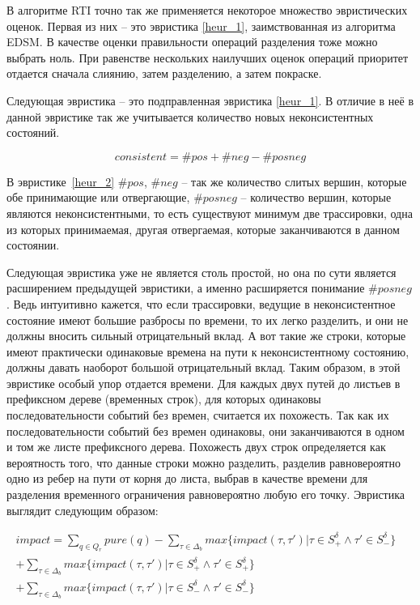 \documentclass[times,specification,annotation]{itmo-student-thesis}
\begin{document}
В алгоритме RTI точно так же применяется некоторое множество эвристических оценок. Первая из них -- это эвристика \ref{heur_1}, заимствованная из алгоритма EDSM. 
В качестве оценки правильности операций разделения тоже можно выбрать ноль. При равенстве нескольких наилучших оценок операций приоритет отдается сначала слиянию, затем разделению, а затем покраске.

Следующая эвристика -- это подправленная эвристика \ref{heur_1}. В отличие в неё в данной эвристике так же учитывается количество новых неконсистентных состояний.

\begin{equation}
  consistent = \#pos + \#neg - \#posneg
  \label{heur_2}
\end{equation}

В эвристике~\ref{heur_2} $\#pos$, $\#neg$ -- так же количество слитых вершин, которые обе принимающие или отвергающие, $\#posneg$ -- количество вершин, которые являются неконсистентными, то есть
существуют минимум две трассировки, одна из которых принимаемая, другая отвергаемая, которые заканчиваются в данном состоянии.

Следующая эвристика уже не является столь простой, но она по сути является расширением предыдущей эвристики, а именно расширяется понимание $\#posneg$. Ведь интуитивно кажется, что
если трассировки, ведущие в неконсистентное состояние имеют большие разбросы по времени, то их легко разделить, и они не должны вносить сильный отрицательный вклад. А вот такие же строки,
которые имеют практически одинаковые времена на пути к неконсистентному состоянию, должны давать наоборот большой отрицательный вклад.
Таким образом, в этой эвристике особый упор отдается времени. Для каждых двух путей до листьев в префиксном дереве (временных строк), 
для которых одинаковы последовательности событий без времен, считается их похожесть. Так как их последовательности событий без времен одинаковы, они заканчиваются в одном и том же листе 
префиксного дерева. Похожесть двух строк определяется как вероятность того, что данные строки можно разделить, разделив равновероятно одно из ребер на пути от корня до листа, выбрав в качестве
времени для разделения временного ограничения равновероятно любую его точку. Эвристика выглядит следующим образом:

\begin{equation}
  \begin{split}
    impact = \mathop{\sum}\limits_{q \in Q_r}pure(q) - \mathop{\sum}\limits_{\tau \in \Delta_b}max\{impact(\tau, \tau') | \tau \in S^\delta_+ \land \tau' \in S^\delta_-\}& \\
						     + \mathop{\sum}\limits_{\tau \in \Delta_b}max\{impact(\tau, \tau') | \tau \in S^\delta_+ \land \tau' \in S^\delta_+\}& \\ 
						     + \mathop{\sum}\limits_{\tau \in \Delta_b}max\{impact(\tau, \tau') | \tau \in S^\delta_- \land \tau' \in S^\delta_-\}&
  \end{split}
  \label{heur_3}
\end{equation}
\end{document}
